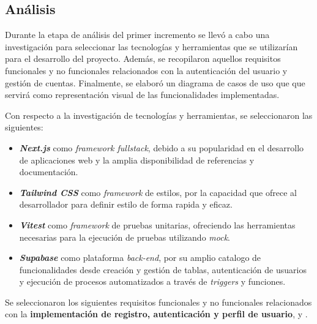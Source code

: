 \subsection{Análisis}

Durante la etapa de análisis del primer incremento se llevó a cabo una investigación para seleccionar las tecnologías y herramientas que se utilizarían para el desarrollo del proyecto. Además, se recopilaron aquellos requisitos funcionales y no funcionales relacionados con la autenticación del usuario y gestión de cuentas. Finalmente, se elaboró un diagrama de casos de uso que que servirá como representación visual de las funcionalidades implementadas.

Con respecto a la investigación de tecnologías y herramientas, se seleccionaron las siguientes:

\begin{itemize}
    \item \textbf{\textit{Next.js}} como \textit{framework fullstack}, debido a su popularidad en el desarrollo de aplicaciones web y la amplia disponibilidad de referencias y documentación.
    \item \textbf{\textit{Tailwind CSS}} como \textit{framework} de estilos, por la capacidad que ofrece al desarrollador para definir estilo de forma rapida y eficaz.
    \item \textbf{\textit{Vitest}} como \textit{framework} de pruebas unitarias, ofreciendo las herramientas necesarias para la ejecución de pruebas utilizando \textit{\gls{mock}}.
    \item \textbf{\textit{Supabase}} como plataforma \textit{back-end}, por su amplio catalogo de funcionalidades desde creación y gestión de tablas, autenticación de usuarios y ejecución de procesos automatizados a través de \textit{triggers} y funciones.
\end{itemize}

Se seleccionaron los siguientes requisitos funcionales y no funcionales relacionados con la \textbf{implementación de registro, autenticación y perfil de usuario},  y .

